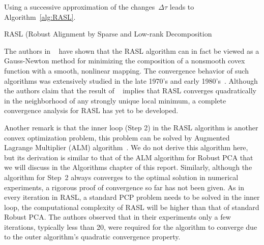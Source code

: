 Using a successive approximation of the changes~$\Delta \tau$ leads to Algorithm~\ref{alg:RASL}.
%
\begin{algorithm}[h!]
\caption{RASL (Robust Alignment by Sparse and Low-rank Decomposition}
\label{alg:RASL}
\end{algorithm}

The authors in ~\cite{Peng:2010} have shown that the RASL algorithm can in fact be viewed as a Gauss-Newton method for minimizing the composition of a nonsmooth covex function with a smooth, nonlinear mapping. The convergence behavior of such algorithms was extensively studied in the late 1970's and early 1980's~\cite{Jittorntrum:1980qy}. Although the authors claim that the result of ~\cite{Jittorntrum:1980qy} implies that RASL converges quadratically in the neighborhood of any strongly unique local minimum, a complete convergence analysis for RASL has yet to be developed. %

Another remark is that the inner loop (Step 2) in the RASL algorithm is another convex optimization problem, this problem can be solved by Augmented Lagrange Multiplier (ALM) algorithm~\cite{Lin:2009kx,Candes:2011fk}. We do not derive this algorithm here, but its derivation is similar to that of the ALM algorithm for Robust PCA that we will discuss in the Algorithms chapter of this report. Similarly, although the algorithm for Step~2 always converges to the optimal solution in numerical experiments, a rigorous proof of convergence so far has not been given. As in every iteration in RASL, a standard PCP problem needs to be solved in the inner loop, the computational complexity of RASL will be higher than that of standard Robust PCA. The authors observed that in their experiments only a few iterations, typically less than 20, were required for the algorithm to converge due to the outer algorithm's quadratic convergence property.

